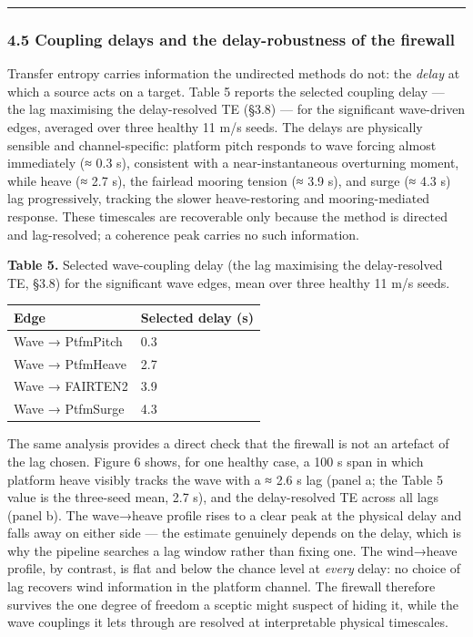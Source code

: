 \documentclass[
  english,
  11pt,
]{article}
\begin{document}
\begin{center}\rule{0.5\linewidth}{0.5pt}\end{center}

\subsubsection{4.5 Coupling delays and the delay-robustness of the
firewall}\label{coupling-delays-and-the-delay-robustness-of-the-firewall}

Transfer entropy carries information the undirected methods do not: the
\emph{delay} at which a source acts on a target. Table 5 reports the
selected coupling delay --- the lag maximising the delay-resolved TE
(§3.8) --- for the significant wave-driven edges, averaged over three
healthy 11 m/s seeds. The delays are physically sensible and
channel-specific: platform pitch responds to wave forcing almost
immediately (≈ 0.3 s), consistent with a near-instantaneous overturning
moment, while heave (≈ 2.7 s), the fairlead mooring tension (≈ 3.9 s),
and surge (≈ 4.3 s) lag progressively, tracking the slower
heave-restoring and mooring-mediated response. These timescales are
recoverable only because the method is directed and lag-resolved; a
coherence peak carries no such information.

\textbf{Table 5.} Selected wave-coupling delay (the lag maximising the
delay-resolved TE, §3.8) for the significant wave edges, mean over three
healthy 11 m/s seeds.

\begin{longtable}[]{@{}ll@{}}
\toprule\noalign{}
Edge & Selected delay (s) \\
\midrule\noalign{}
\endhead
\bottomrule\noalign{}
\endlastfoot
Wave → PtfmPitch & 0.3 \\
Wave → PtfmHeave & 2.7 \\
Wave → FAIRTEN2 & 3.9 \\
Wave → PtfmSurge & 4.3 \\
\end{longtable}

The same analysis provides a direct check that the firewall is not an
artefact of the lag chosen. Figure 6 shows, for one healthy case, a 100
s span in which platform heave visibly tracks the wave with a ≈ 2.6 s
lag (panel a; the Table 5 value is the three-seed mean, 2.7 s), and the
delay-resolved TE across all lags (panel b). The wave→heave profile
rises to a clear peak at the physical delay and falls away on either
side --- the estimate genuinely depends on the delay, which is why the
pipeline searches a lag window rather than fixing one. The wind→heave
profile, by contrast, is flat and below the chance level at \emph{every}
delay: no choice of lag recovers wind information in the platform
channel. The firewall therefore survives the one degree of freedom a
sceptic might suspect of hiding it, while the wave couplings it lets
through are resolved at interpretable physical timescales.
\end{document}
